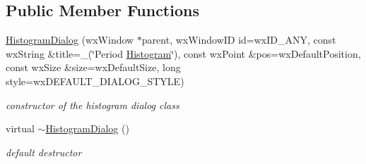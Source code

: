 \subsection*{Public Member Functions}
\begin{DoxyCompactItemize}
\item 
\mbox{\label{classHistogramDialog_ab76f6dad4e2ee061e80de94f33f0e68c}} 
\hyperlink{classHistogramDialog_ab76f6dad4e2ee061e80de94f33f0e68c}{Histogram\+Dialog} (wx\+Window $\ast$parent, wx\+Window\+ID id=wx\+I\+D\+\_\+\+A\+NY, const wx\+String \&title=\+\_\+(\char`\"{}Period \hyperlink{classHistogram}{Histogram}\char`\"{}), const wx\+Point \&pos=wx\+Default\+Position, const wx\+Size \&size=wx\+Default\+Size, long style=wx\+D\+E\+F\+A\+U\+L\+T\+\_\+\+D\+I\+A\+L\+O\+G\+\_\+\+S\+T\+Y\+LE)
\begin{DoxyCompactList}\small\item\em constructor of the histogram dialog class \end{DoxyCompactList}\item 
\mbox{\label{classHistogramDialog_a43d2e19cd3d198f6c6d825a9c1bea643}} 
virtual \hyperlink{classHistogramDialog_a43d2e19cd3d198f6c6d825a9c1bea643}{$\sim$\+Histogram\+Dialog} ()
\begin{DoxyCompactList}\small\item\em default destructor \end{DoxyCompactList}\end{DoxyCompactItemize}
